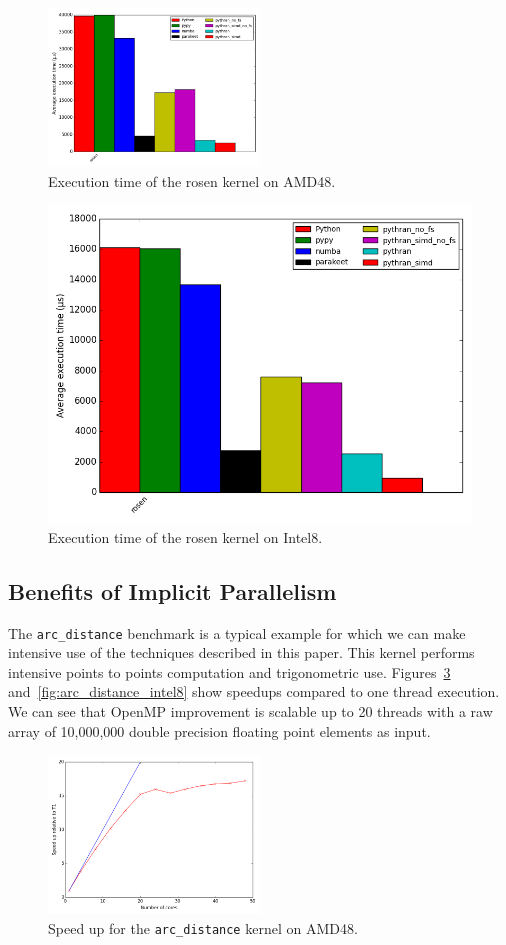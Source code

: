 \documentclass[10pt, preprint]{sigplanconf}
\begin{document}
\begin{figure}[t]
\centering
\includegraphics[width=0.5\textwidth]{rosen_amd48.png}
\caption{Execution time of the rosen kernel on AMD48.}
\label{fig:rosenamd48}
\end{figure}

\begin{figure}[t]
\centering
\includegraphics[width=.5\textwidth]{rosen_intel8.png}
\caption{Execution time of the rosen kernel on Intel8.}
\label{fig:rosenintel8}
\end{figure}

\subsection{Benefits of Implicit Parallelism}

The \texttt{arc\_distance} benchmark is a typical example for which we can make
intensive use of the techniques described in this paper. This kernel performs
intensive points to points computation and trigonometric use.
Figures~\ref{fig:arc_distance} and~\ref{fig:arc_distance_intel8} show speedups
compared to one thread execution. We can see that OpenMP improvement is
scalable up to 20 threads with a raw array of 10,000,000 double precision
floating point elements as input.

\begin{figure}[t]
\centering
\includegraphics[width=0.5\textwidth]{arc_distance_amd48.png}
\caption{Speed up for the \texttt{arc\_distance} kernel on AMD48.}
\label{fig:arc_distance}
\end{figure}
\end{document}
